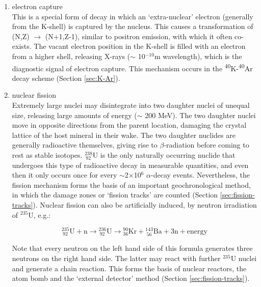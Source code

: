 \documentclass{book}
\begin{document}
\begin{enumerate}
\item{electron capture}\\ This is a special form of decay in which an
  `extra-nuclear' electron (generally from the K-shell) is captured by
  the nucleus. This causes a transformation of (N,Z) $\rightarrow$
  (N+1,Z-1), similar to positron emission, with which it often
  co-exists. The vacant electron position in the K-shell is filled with
  an electron from a higher shell, releasing X-rays ($\sim$
  10$^{-10}$m wavelength), which is the diagnostic signal of electron
  capture. This mechanism occurs in the
  \textsuperscript{40}K-\textsuperscript{40}Ar decay scheme (Section
  \ref{sec:K-Ar}).

\item{nuclear fission}\\ Extremely large nuclei may disintegrate into
  two daughter nuclei of unequal size, releasing large amounts of
  energy ($\sim$ 200 MeV). The two daughter nuclei move in opposite
  directions from the parent location, damaging the crystal lattice of
  the host mineral in their wake. The two daughter nuclides are
  generally radioactive themselves, giving rise to $\beta$-radiation
  before coming to rest as stable isotopes.  $^{238}_{~92}$U is the
  only naturally occurring nuclide that undergoes this type of
  radioactive decay in measurable quantities, and even then it only
  occurs once for every $\sim$2$\times$10$^6$ $\alpha$-decay events.
  Nevertheless, the fission mechanism forms the basis of an important
  geochronological method, in which the damage zones or `fission
  tracks' are counted (Section \ref{sec:fission-tracks}). Nuclear
  fission can also be artificially induced, by neutron irradiation of
  $^{235}$U, e.g.:

\begin{equation}
{}^{235}_{~92}\mathrm{U} + \mathrm{n} \rightarrow
{}^{236}_{~92}\mathrm{U} \rightarrow {}^{90}_{36}\mathrm{Kr} +
{}^{143}_{~56}\mathrm{Ba} + 3\mathrm{n} + \mbox{energy}
\label{eq:235Ufission}
\end{equation}

Note that every neutron on the left hand side of this formula
generates three neutrons on the right hand side. The latter may react
with further $^{235}$U nuclei and generate a chain reaction. This
forms the basis of nuclear reactors, the atom bomb and the `external
detector' method (Section \ref{sec:fission-tracks}).

\end{enumerate}
\end{document}
